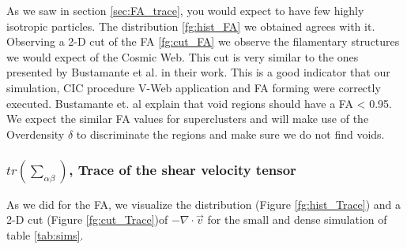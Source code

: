 \documentclass[12pt]{article}
\begin{document}
\begin{par}
As we saw in section \ref{sec:FA_trace}, you would
 expect to have few highly isotropic particles.
  The distribution \ref{fg:hist_FA} we obtained
   agrees with it.\\
Observing a 2-D cut of the FA \ref{fg:cut_FA} we
 observe the filamentary structures we would
  expect of the Cosmic Web. This cut is very
   similar to the ones presented by  Bustamante et
   al.  \cite{bustamante_tensor_2015} in their
    work. This is a good indicator that our
     simulation, CIC procedure V-Web application
      and FA forming were correctly executed.
       Bustamante et. al  explain that void
        regions should have a FA < 0.95. We expect
         the similar FA values for superclusters
          and will make use of the Overdensity
           $\delta$ to discriminate the    
            regions and make sure we do not find
             voids.

\end{par}


\subsubsection{$tr \left(\sum_{\alpha\beta}\right)$, Trace of the shear velocity tensor}
As we did for the FA, we visualize the
 distribution (Figure \ref{fg:hist_Trace}) and a
  2-D cut (Figure \ref{fg:cut_Trace})of $-\nabla
   \cdot \vec{v}$ for the small and dense
    simulation of table \ref{tab:sims}.
\end{document}
